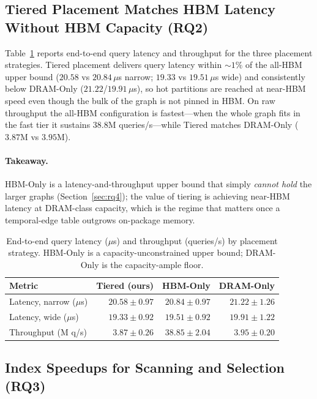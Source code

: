 \documentclass[10pt]{article}
\theoremstyle{definition}
\begin{document}
\subsection{Tiered Placement Matches HBM Latency Without HBM Capacity (RQ2)}
\label{sec:rq2}

Table~\ref{tab:e2e} reports end-to-end query latency and throughput for the three
placement strategies. Tiered placement delivers query latency within ${\sim}1\%$ of
the all-HBM upper bound ($20.58$ vs $20.84\,\mu$s narrow; $19.33$ vs $19.51\,\mu$s
wide) and consistently below DRAM-Only ($21.22$/$19.91\,\mu$s), so hot partitions are
reached at near-HBM speed even though the bulk of the graph is not pinned in HBM. On
raw throughput the all-HBM configuration is fastest---when the whole graph fits in
the fast tier it sustains $38.8$M queries/s---while Tiered matches DRAM-Only ($3.87$M
vs $3.95$M).

\paragraph{Takeaway.}
HBM-Only is a latency-and-throughput upper bound that simply \emph{cannot hold} the
larger graphs (Section~\ref{sec:rq4}); the value of tiering is achieving near-HBM
latency at DRAM-class capacity, which is the regime that matters once a temporal-edge
table outgrows on-package memory.

\begin{table}[t]
\centering
\caption{End-to-end query latency ($\mu$s) and throughput (queries/s) by placement
strategy. HBM-Only is a capacity-unconstrained upper bound; DRAM-Only is the
capacity-ample floor.}
\label{tab:e2e}
\begin{tabular}{lrrr}
\toprule
Metric & Tiered (ours) & HBM-Only & DRAM-Only \\
\midrule
Latency, narrow ($\mu$s) & $20.58\pm0.97$ & $20.84\pm0.97$ & $21.22\pm1.26$ \\
Latency, wide ($\mu$s)   & $19.33\pm0.92$ & $19.51\pm0.92$ & $19.91\pm1.22$ \\
Throughput (M q/s)       & $3.87\pm0.26$  & $38.85\pm2.04$ & $3.95\pm0.20$ \\
\bottomrule
\end{tabular}
\end{table}

\subsection{Index Speedups for Scanning and Selection (RQ3)}
\label{sec:rq3}
\end{document}

